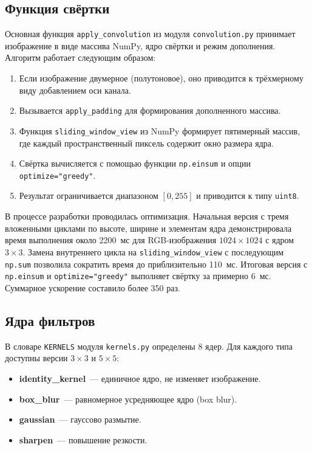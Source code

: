 \documentclass[a4paper]{article}
\begin{document}
\subsection{Функция свёртки}

Основная функция \verb|apply_convolution| из модуля \verb|convolution.py| принимает изображение в виде массива NumPy, ядро свёртки и режим дополнения. Алгоритм работает следующим образом:

\begin{enumerate}
    \item Если изображение двумерное (полутоновое), оно приводится к трёхмерному виду добавлением оси канала.
    \item Вызывается \verb|apply_padding| для формирования дополненного массива.
    \item Функция \verb|sliding_window_view| из NumPy формирует пятимерный массив, где каждый пространственный пиксель содержит окно размера ядра.
    \item Свёртка вычисляется с помощью функции \verb|np.einsum| и опции \verb|optimize="greedy"|.
    \item Результат ограничивается диапазоном $[0, 255]$ и приводится к типу \verb|uint8|.
\end{enumerate}

В процессе разработки проводилась оптимизация. Начальная версия с тремя вложенными циклами по высоте, ширине и элементам ядра демонстрировала время выполнения около 2200~мс для RGB-изображения $1024 \times 1024$ с ядром $3 \times 3$. Замена внутреннего цикла на \verb|sliding_window_view| с последующим \verb|np.sum| позволила сократить время до приблизительно 110~мс. Итоговая версия с \verb|np.einsum| и \verb|optimize="greedy"| выполняет свёртку за примерно 6~мс. Суммарное ускорение составило более 350 раз.

\subsection{Ядра фильтров}

В словаре \verb|KERNELS| модуля \verb|kernels.py| определены 8 ядер. Для каждого типа доступны версии $3 \times 3$ и $5 \times 5$:

\begin{itemize}
    \item \textbf{identity\_kernel}~--- единичное ядро, не изменяет изображение.
    \item \textbf{box\_blur}~--- равномерное усредняющее ядро (box blur).
    \item \textbf{gaussian}~--- гауссово размытие.
    \item \textbf{sharpen}~--- повышение резкости.
\end{itemize}
\end{document}
